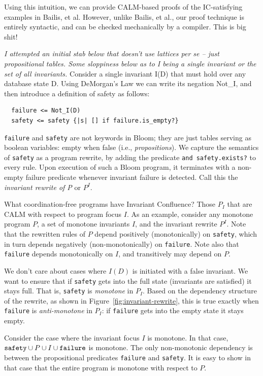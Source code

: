 \documentclass{sig-alternate}
\begin{document}
Using this intuition, we can provide CALM-based proofs of the IC-satisfying examples in Bailis, et al.  However, unlike Bailis, et al., our proof technique is entirely syntactic, and can be checked mechanically by a compiler.  This is big shit! 


\emph{I attempted an initial stab below that doesn't use lattices per se -- just propositional tables.  Some sloppiness below as to I being a single invariant or the set of all invariants.}
Consider a single invariant I(D) that must hold over any database state D.  Using DeMorgan's Law we can write its negation Not\_I, and then introduce a definition of safety as follows:

\begin{verbatim}
  failure <= Not_I(D)
  safety <= safety {|s| [] if failure.is_empty?}
\end{verbatim}

\texttt{failure} and \texttt{safety} are not keywords in Bloom; they are just tables serving as boolean variables: empty when false (i.e., \emph{propositions}). We capture the semantics of \texttt{safety} as a program rewrite, by adding the predicate \texttt{and safety.exists?} to every rule.  Upon execution of such a Bloom program, it terminates with a non-empty failure predicate whenever invariant failure is detected.  Call this the \emph{invariant rewrite of P} or $P^I$.  

What coordination-free programs have Invariant Confluence?   Those $P_I$ that are CALM with respect to program focus $I$. As an example, consider any monotone program $P$, a set of monotone invariants $I$, and the invariant rewrite $P^I$.  Note that the rewritten rules of $P$ depend positively (monotonically) on \texttt{safety}, which in turn depends negatively (non-monotonically) on \texttt{failure}.  Note also that \texttt{failure} depends monotonically on $I$, and transitively may depend on $P$.

We don't care about cases where $I(D)$ is initiated with a false invariant.  We want to ensure that if \texttt{safety} gets into the full state (invariants are satisfied) it stays full.  That is, \texttt{safety} is \emph{monotone} in $P_I$.   Based on the dependency structure of the rewrite, as shown in Figure~\ref{fig:invariant-rewrite}, this is true exactly when \texttt{failure} is \emph{anti-monotone} in $P_I$: if \texttt{failure} gets into the empty state it stays empty.  

Consider the case where the invariant focus $I$ is monotone.  In that case, $\mbox{\texttt{safety}} \cup P \cup I \cup \mbox{\texttt{failure}}$ is monotone. The only non-monotonic dependency is between the propositional predicates \texttt{failure} and \texttt{safety}.  It is easy to show in that case that the entire program is monotone with respect to $P$.
\end{document}

